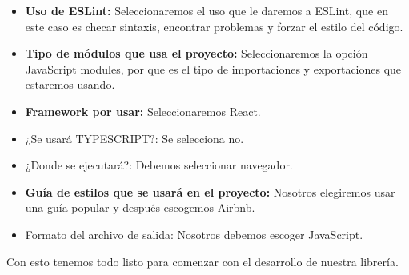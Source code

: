     \begin{itemize}
    \item \textbf{Uso de ESLint:  }Seleccionaremos el uso que le daremos a ESLint, que en este caso es checar sintaxis, encontrar problemas y forzar el estilo del código.
    \item \textbf{Tipo de módulos que usa el proyecto:} Seleccionaremos la opción JavaScript modules, por que es el tipo de importaciones y exportaciones que estaremos usando.
    \item \textbf{Framework por usar: }Seleccionaremos React.
    \item ¿Se usará TYPESCRIPT?: Se selecciona no. 
    \item ¿Donde se ejecutará?: Debemos seleccionar navegador.
    \item \textbf{Guía de estilos que se usará en el proyecto: } Nosotros elegiremos usar una guía popular  y después escogemos Airbnb.
    \item Formato del archivo de salida: Nosotros debemos escoger JavaScript.
    \end{itemize}
    Con esto tenemos todo listo para comenzar con el desarrollo de nuestra librería.
    \newpage
